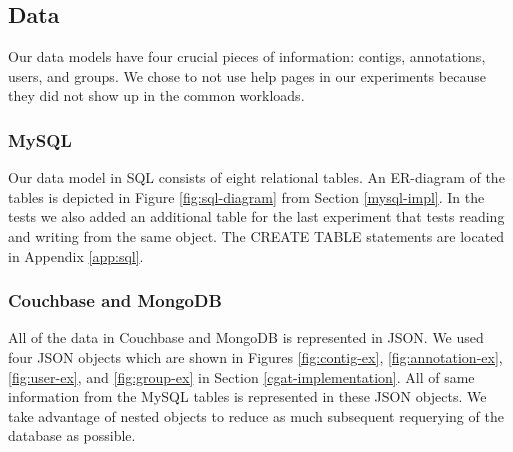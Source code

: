 \documentclass[12pt]{ucthesis}
\begin{document}
\subsection{Data}
Our data models have four crucial pieces of information: contigs, annotations,
users, and groups. We chose to not use help pages in our experiments because they did
not show up in the common workloads.

\subsubsection{MySQL}
Our data model in SQL consists of eight relational tables. An ER-diagram of the tables is depicted in Figure
\ref{fig:sql-diagram} from Section \ref{mysql-impl}. In the tests we also added an additional table for the last experiment that tests reading and writing from the same object. The CREATE TABLE statements are located in
Appendix \ref{app:sql}.


\subsubsection{Couchbase and MongoDB}
All of the data in Couchbase and MongoDB is represented in JSON.
 We used four JSON objects
which are shown in Figures \ref{fig:contig-ex}, \ref{fig:annotation-ex},
\ref{fig:user-ex}, and \ref{fig:group-ex} in Section
\ref{cgat-implementation}. All of same information from the MySQL tables is
represented in these JSON objects. We take advantage of nested objects to
reduce as much subsequent requerying of the database as possible.
\end{document}
